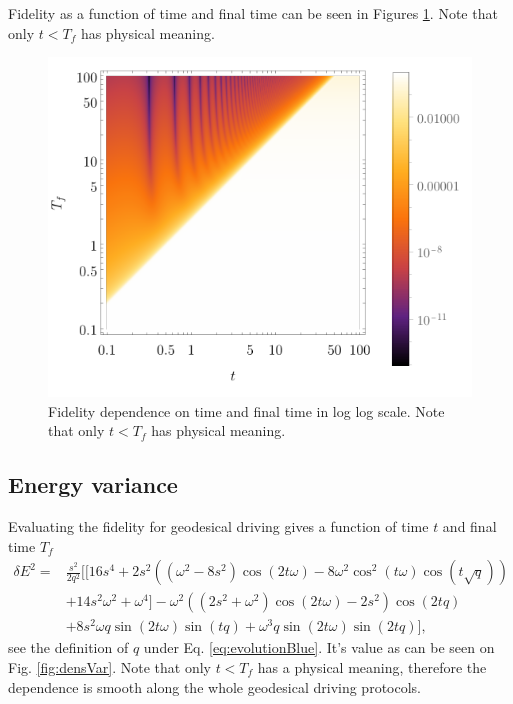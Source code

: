 Fidelity as a function of time and final time can be seen in Figures \ref{fig:dens3}. Note that only $t<T_f$ has physical meaning.

\begin{figure}[H]
    \centering
    \includegraphics[scale=1.2]{../img/dens3.pdf}
    \caption{Fidelity dependence on time and final time in log log scale. Note that only $t<T_f$ has physical meaning.}
    \label{fig:dens3}
\end{figure}

\subsection{Energy variance}
Evaluating the fidelity for geodesical driving gives a function of time $t$ and final time $T_f$
\begin{equation}
    \begin{split}        
        \delta E^2 =& \frac{s^2}{2 q^2}\Bigg[\Big[16 s^4+2 s^2 \left(\left(\omega ^2-8 s^2\right) \cos (2 t \omega )-8 \omega ^2 \cos ^2(t \omega ) \cos \left(t \sqrt{q}\right)\right)\\
        &+14 s^2 \omega ^2+\omega ^4\Big] -\omega ^2 \left(\left(2 s^2+\omega ^2\right) \cos (2 t \omega )-2 s^2\right) \cos \left(2 t q\right)\\
        & +8 s^2 \omega  q \sin (2 t \omega ) \sin \left(t q\right) + \omega ^3 q \sin (2 t \omega ) \sin \left(2 t q\right) \Bigg],
\end{split}
\end{equation}
see the definition of $q$ under Eq. \ref{eq:evolutionBlue}. It's value as can be seen on Fig. \ref{fig:densVar}. Note that only $t<T_f$ has a physical meaning, therefore the dependence is smooth along the whole geodesical driving protocols.

